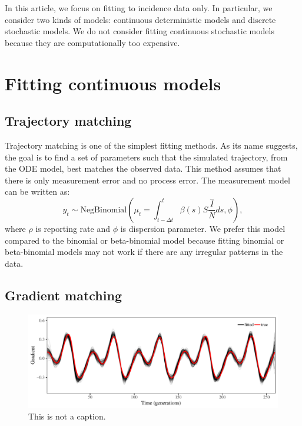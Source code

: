 \documentclass{article}
\begin{document}
In this article, we focus on fitting to incidence data only.
In particular, we consider two kinds of models: continuous deterministic models and discrete stochastic models.
We do not consider fitting continuous stochastic models because they are computationally too expensive.

\section{Fitting continuous models}

\subsection{Trajectory matching}

Trajectory matching is one of the simplest fitting methods.
As its name suggests, the goal is to find a set of parameters such that the simulated trajectory, from the ODE model, best matches the observed data.
This method assumes that there is only measurement error and no process error.
The measurement model can be written as:
\begin{equation}
y_t \sim \mathrm{NegBinomial}\left(\mu_t= \int_{t-\Delta t}^{t} \beta(s) S \frac{\hat{I}}{N} ds, \phi \right),
\end{equation}
where $\rho$ is reporting rate and $\phi$ is dispersion parameter.
We prefer this model compared to the binomial or beta-binomial model because fitting binomial or beta-binomial models may not work if there are any irregular patterns in the data.

\subsection{Gradient matching}

\begin{figure}[t]
\includegraphics[width=\textwidth]{../figure/gradient_matching_sinusoidal.pdf}
\caption{This is not a caption.}
\end{figure}
\end{document}
